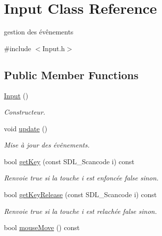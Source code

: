 \hypertarget{classInput}{\section{Input Class Reference}
\label{classInput}
}


gestion des évênements  




{\ttfamily \#include $<$Input.\-h$>$}

\subsection*{Public Member Functions}
\begin{DoxyCompactItemize}
\item 
\hyperlink{classInput_abae3f379d3f157cf42dc857309832dba}{Input} ()
\begin{DoxyCompactList}\small\item\em Constructeur. \end{DoxyCompactList}\item 
\hypertarget{classInput_aa7fe26710dd863d11737bf2f6de4ad05}{void \hyperlink{classInput_aa7fe26710dd863d11737bf2f6de4ad05}{update} ()}\label{classInput_aa7fe26710dd863d11737bf2f6de4ad05}

\begin{DoxyCompactList}\small\item\em Mise à jour des évênements. \end{DoxyCompactList}\item 
\hypertarget{classInput_adafc672c3b01194f8adfc120da0d00fe}{bool \hyperlink{classInput_adafc672c3b01194f8adfc120da0d00fe}{get\-Key} (const S\-D\-L\-\_\-\-Scancode i) const }\label{classInput_adafc672c3b01194f8adfc120da0d00fe}

\begin{DoxyCompactList}\small\item\em Renvoie true si la touche i est enfoncée false sinon. \end{DoxyCompactList}\item 
\hypertarget{classInput_a23a27890996e4b7af907098d9cb896d7}{bool \hyperlink{classInput_a23a27890996e4b7af907098d9cb896d7}{get\-Key\-Release} (const S\-D\-L\-\_\-\-Scancode i) const }\label{classInput_a23a27890996e4b7af907098d9cb896d7}

\begin{DoxyCompactList}\small\item\em Renvoie true si la touche i est relachée false sinon. \end{DoxyCompactList}\item 
\hypertarget{classInput_af6198fd243064d36ab465baa06b039e1}{bool \hyperlink{classInput_af6198fd243064d36ab465baa06b039e1}{mouse\-Move} () const }\label{classInput_af6198fd243064d36ab465baa06b039e1}


\end{DoxyCompactItemize}
